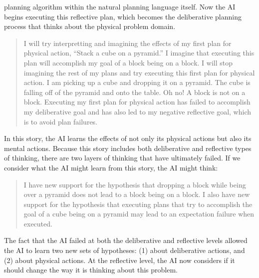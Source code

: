 planning algorithm within the natural planning language itself.  Now
the AI begins executing this reflective plan, which becomes the
deliberative planning process that thinks about the physical problem
domain.
\begin{quote}
  I will try interpretting and imagining the effects of my first plan
  for physical action, ``Stack a cube on a pyramid.''  I imagine that
  executing this plan will accomplish my goal of a block being on a
  block.  I will stop imagining the rest of my plans and try executing
  this first plan for physical action.  I am picking up a cube and
  dropping it on a pyramid.  The cube is falling off of the pyramid
  and onto the table.  Oh no!  A block is not on a block.  Executing
  my first plan for physical action has failed to accomplish my
  deliberative goal and has also led to my negative reflective goal,
  which is to avoid plan failures.
\end{quote}
In this story, the AI learns the effects of not only its physical
actions but also its mental actions.  Because this story includes both
deliberative and reflective types of thinking, there are two layers of
thinking that have ultimately failed.  If we consider what the AI
might learn from this story, the AI might think:
\begin{quote}
  I have new support for the hypothesis that dropping a block while
  being over a pyramid does not lead to a block being on a block.  I
  also have new support for the hypothesis that executing plans that
  try to accomplish the goal of a cube being on a pyramid may lead to
  an expectation failure when executed.
\end{quote}
The fact that the AI failed at both the deliberative and reflective
levels allowed the AI to learn two new sets of hypotheses: (1) about
deliberative actions, and (2) about physical actions.  At the
reflective level, the AI now considers if it should change the way it
is thinking about this problem.

